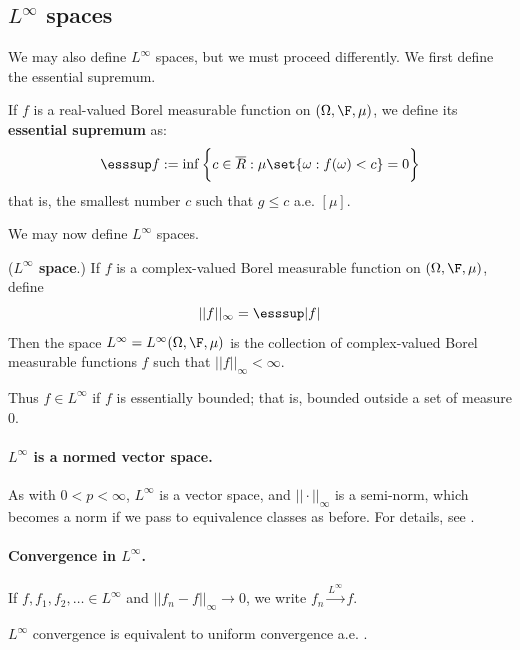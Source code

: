 \documentclass{article} %
\newcommand{\convergenceInLinfty}{\stackrel{L^\infty}{\to}}
\begin{document}
\subsection{$L^\infty$ spaces} \label{sec:L_infty_spaces}

We may also define $L^\infty$ spaces, but we must proceed differently.   We first define the essential supremum.

\begin{definition}
If $f$ is a real-valued Borel measurable function on $(\Omega, \F, \mu)$, we define its \textbf{essential supremum} as:
\[ \esssup f := \inf \bigg\{c \in \overline{R} : \mu\set{\omega : f(\omega) < c} = 0 \bigg\} \]
that is, the smallest number $c$ such that $g \leq c$ a.e. $[\mu]$.
\end{definition}


We may now define $L^\infty$ spaces.

\begin{definition}{(\textbf{$L^\infty$ space}.)} If $f$ is a complex-valued Borel measurable function on $(\Omega, \F, \mu)$, define 
\[  ||f||_\infty = \esssup |f|\]
Then the space $L^\infty = L^\infty(\Omega, \F, \mu)$ is the collection of complex-valued Borel measurable functions $f$ such that $||f||_\infty < \infty$.
\end{definition}

Thus $f \in L^\infty$ if $f$ is essentially bounded; that is, bounded outside a set of measure 0.

\paragraph{$L^\infty$ is a normed vector space.} As with $0<p<\infty$, $L^\infty$ is a vector space, and $||\cdot||_\infty$ is a semi-norm, which becomes a norm if we pass to equivalence classes as before.  For details, see \cite[pp.93]{ash2000probability}.

\paragraph{Convergence in $L^\infty$.} If $f,f_1,f_2,\hdots \in L^\infty$ and $||f_n - f||_\infty \to 0$, we write $f_n \convergenceInLinfty f$.  

\begin{remark}
$L^\infty$ convergence is equivalent to uniform convergence a.e. \cite[pp.93]{ash2000probability}.
\label{rk:L_infty_convergence_is_equivalent_to_uniform_cconvergence_ae}
\end{remark}
\end{document}
